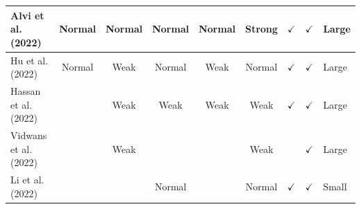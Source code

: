 \documentclass[../access.tex]{subfiles}
\begin{document}
\begin{table}[htbp]
\begin{adjustwidth}{-2cm}{}
\begin{tabular}{m{4.4cm} c c c c c c c >{\centering\arraybackslash}m{0.7cm}}
            \hline
            \footnotesize{Alvi et al. (2022) \cite{Alvi2022}}              & {Normal}                                                                                    & {Normal}                                         & {Normal}               & {Normal}                     & {Strong}                  & $ \checkmark $          & $ \checkmark $            & \footnotesize{Large} \\
            \hline
            \footnotesize{Hu et al. (2022) \cite{Hu2022}}                  & {Normal}                                                                                    & {Weak}                                           & {Normal}               & {Weak}                       & {Normal}                  & $ \checkmark $          & $ \checkmark $            & \footnotesize{Large} \\
            \hline
            \footnotesize{Hassan et al. (2022) \cite{Hassan2022}}          & {}                                                                                          & {Weak}                                           & {Weak}                 & {Weak}                       & {Weak}                    & $ \checkmark $          & $ \checkmark $            & \footnotesize{Large} \\
            \hline
            \footnotesize{Vidwans et al. (2022) \cite{Vidwans2022}}        & {}                                                                                          & {Weak}                                           & {}                     & {}                           & {Weak}                    & {}                      & $ \checkmark $            & \footnotesize{Large} \\
            \hline
            \footnotesize{Li et al. (2022) \cite{Li2022}}                  & {}                                                                                          & {}                                               & {Normal}               & {}                           & {Normal}                  & $ \checkmark $          & $ \checkmark $            & \footnotesize{Small} \\
            \bottomrule
        \end{tabular}
    \end{adjustwidth}
    \label{tbl:table4}
\end{table}
\end{document}
